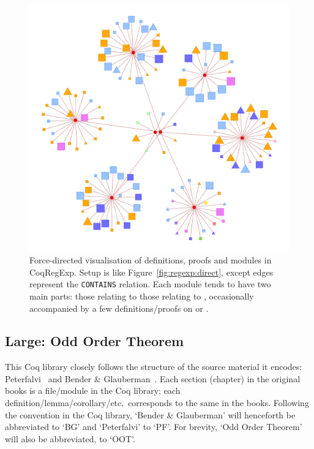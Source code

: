 \begin{figure}[tp]
\centering
\includegraphics[height=0.3\textheight]{img/regexp/module.png}
\caption{Force-directed visualisation of definitions, proofs and modules in
  CoqRegExp. Setup is like Figure~\ref{fig:regexp:direct}, except
  edges represent the \texttt{CONTAINS} relation. Each module tends to have two
  main parts: those relating to  those relating to
  , occasionally accompanied by a few
  definitions/proofs on  or .}\label{fig:regexp:module}
\end{figure}

\subsection{Large: Odd Order Theorem}

This Coq library closely follows the structure of the source material it
encodes: Peterfalvi~\cite{peterfalvi2000oot} and Bender \&
Glauberman~\cite{bender1994oot}. Each section (chapter) in the original books is
a file/module in the Coq library; each definition/lemma/corollary/etc.\
corresponds to the same in the books. Following the convention in the Coq
library, `Bender \& Glauberman' will henceforth be abbreviated to `BG' and
`Peterfalvi' to `PF'. For brevity, `Odd Order Theorem' will also be abbreviated,
to `OOT'.

